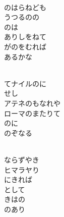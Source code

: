 \documentclass[10pt,b5j]{tarticle} %
\begin{document}
\vspace{1.5em} %
\newcommand{\linespace}{0.5em} %
\newcommand{\blocksize}{0.5\hsize} %
\newcommand{\itemmargin}{3em} %
\begin{enumerate} %
    \setlength{\itemindent}{\itemmargin} %
    \begin{minipage}[c]{\blocksize}
    
        \vspace{\linespace}
        \item~\\
        のはらねども\\
        うつるのの\\
        のは\\
        ありしをねて\\
        がのをむれば\\
        あるかな
        
    \end{minipage}
    \begin{minipage}[c]{\blocksize}
        
        \vspace{\linespace}
        \item~\\
        てナイルのに\\
        せし\\
        アテネのもなれや\\
        ローマのまたりて\\
        のに\\
        のぞなる
        
    \end{minipage}
    \begin{minipage}[c]{\blocksize}
        
        \vspace{\linespace}
        \item~\\
        ならずやき\\
        ヒマラヤり\\
        にきれば\\
        として\\
        きはの\\
        のあり
        

\end{minipage}
\end{enumerate}
\end{document}
